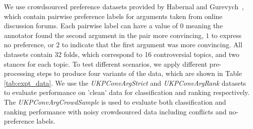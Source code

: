We use crowdsourced preference datasets provided by 
Habernal and Gurevych~,
which contain pairwise preference labels for arguments taken from online discussion forums. 
Each pairwise label can have a value of $0$ meaning the annotator found the second argument in the pair more convincing,
$1$ to express no preference, or $2$ to indicate that the first argument was more convincing.
All datasets contain 32 folds, which correspond to 16 controversial topics, and two stances for each topic.
To test different scenarios, we apply different pre-processing steps to produce 
four variants of the data, which are shown in Table \ref{tab:expt_data}.
We use the \emph{UKPConvArgStrict} and \emph{UKPConvArgRank} datasets to evaluate performance on 'clean' data for
 classification and ranking respectively. The 
 \emph{UKPConvArgCrowdSample} is used to evaluate both classification
 and ranking performance with noisy crowdsourced data including conflicts and no-preference labels.
